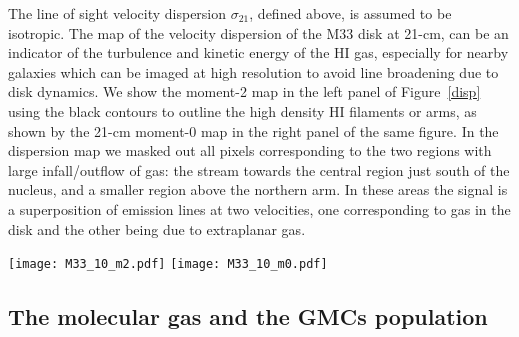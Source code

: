 \documentclass{aa}
\begin{document}
The line of sight velocity dispersion $\sigma_{21}$, defined above, is assumed to be isotropic. 
The map of the velocity dispersion of the M33 disk at 21-cm, can be an indicator of the turbulence and kinetic energy
of the HI gas, especially for nearby galaxies which can be imaged at high resolution to avoid
line broadening due to disk dynamics. We show the  moment-2 map in the left panel of
Figure~\ref{disp} using the black contours to outline the high density HI filaments or arms,
as shown by the 21-cm moment-0 map in the right panel of the same figure. 
In the dispersion map we masked out all pixels
corresponding to the two regions with large infall/outflow of gas: the stream
towards the central region just south of the nucleus, and a smaller region above the northern arm. 
In these areas the signal is a superposition of emission lines at two velocities, one corresponding
to gas in the disk  and the other being due to extraplanar gas. 

\begin{figure*}
\centerline{
\hspace*{1cm}\texttt{[image: M33\_10\_m2.pdf]}
\hspace*{-3cm}\texttt{[image: M33\_10\_m0.pdf]}}
\caption{Velocity dispersion (moment-2) map of the 21-cm line emission  in M33  at 10~arcsec resolution ({\it left panel}).
The black contours underline the location of the bright HI filaments or arms,  they are drawn at 
0.2~Jy~beam$^{-1}$~km~$s^{-1}$ and   overlayed also on the moment-0 map  in the {\it right panel}. 
The two areas that have been masked out for the likely presence of gas infall/outflow   (the stream
towards the central region in the southern half and a smaller region above the northern arm) have
anomalously large velocity dispersions and have yellow-red  colours in the velocity dispersion map. The colour legend for the
velocity dispersion map ({\it left panel}) is in units of km~s$^{-1}$,  for the intensity map ({\it right panel})  is in  
Jy~beam$^{-1}$ km~s$^{-1}$. Coordinates of the map centers are written in the bottom part of the Figure.
}
\label{disp}
\end{figure*}
 


\subsection{The molecular gas and the GMCs population}
\end{document}
